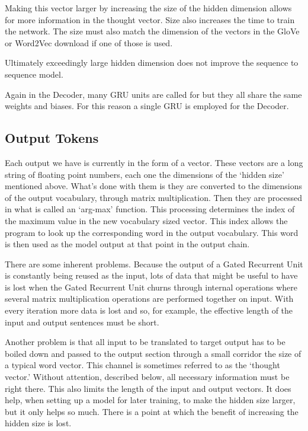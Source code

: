 Making this vector larger by increasing the size of the hidden dimension allows for more information in the thought vector. Size also increases the time to train the network. The size must also match the dimension of the vectors in the GloVe or Word2Vec download if one of those is used. 

Ultimately exceedingly large hidden dimension does not improve the sequence to sequence model.

Again in the Decoder, many GRU units are called for but they all share the same weights and biases. For this reason a single GRU is employed for the Decoder.

\subsection*{Output Tokens}
Each output we have is currently in the form of a vector. These vectors are a long string of floating point numbers, each one the dimensions of the `hidden size' mentioned above. What's done with them is they are converted to the dimensions of the output vocabulary, through matrix multiplication. Then they are processed in what is called an `arg-max' function. This processing determines the index of the maximum value in the new vocabulary sized vector. This index allows the program to look up the corresponding word in the output vocabulary. This word is then used as the model output at that point in the output chain.

There are some inherent problems. Because the output of a Gated Recurrent Unit is constantly being reused as the input, lots of data that might be useful to have is lost when the Gated Recurrent Unit churns through internal operations where several matrix multiplication operations are performed together on input. With every iteration more data is lost and so, for example, the effective length of the input and output sentences must be short. 

Another problem is that all input to be translated to target output has to be boiled down and passed to the output section through a small corridor the size of a typical word vector. This channel is sometimes referred to as the `thought vector.' Without attention, described below, all necessary information must be right there. This also limits the length of the input and output vectors. It does help, when setting up a model for later training, to make the hidden size larger, but it only helps so much. There is a point at which the benefit of increasing the hidden size is lost.

